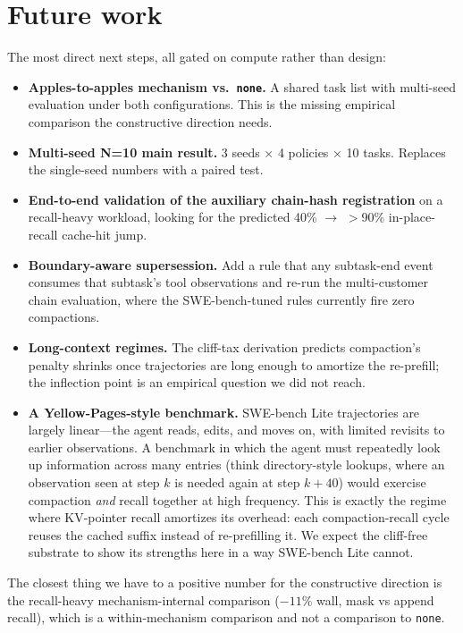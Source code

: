 \documentclass[letterpaper,twocolumn,10pt]{article}
\begin{document}
\section{Future work}
\label{sec:future}

The most direct next steps, all gated on compute rather than
design:

\begin{itemize}[itemsep=2pt,topsep=2pt]
\item \textbf{Apples-to-apples mechanism vs.~\texttt{none}.}
A shared task list with multi-seed evaluation under both
configurations. This is the missing empirical comparison the
constructive direction needs.
\item \textbf{Multi-seed N=10 main result.} 3 seeds × 4 policies
× 10 tasks. Replaces the single-seed numbers with a paired test.
\item \textbf{End-to-end validation of the auxiliary chain-hash
registration} on a recall-heavy workload, looking for the
predicted 40\% $\to$ $>$90\% in-place-recall cache-hit jump.
\item \textbf{Boundary-aware supersession.} Add a rule that any
subtask-end event consumes that subtask's tool observations and
re-run the multi-customer chain evaluation, where the
SWE-bench-tuned rules currently fire zero compactions.
\item \textbf{Long-context regimes.} The cliff-tax derivation
predicts compaction's penalty shrinks once trajectories are long
enough to amortize the re-prefill; the inflection point is an
empirical question we did not reach.
\item \textbf{A Yellow-Pages-style benchmark.} SWE-bench Lite
trajectories are largely linear---the agent reads, edits, and
moves on, with limited revisits to earlier observations. A
benchmark in which the agent must repeatedly look up
information across many entries (think directory-style
lookups, where an observation seen at step $k$ is needed again
at step $k{+}40$) would exercise compaction \emph{and} recall
together at high frequency. This is exactly the regime where
KV-pointer recall amortizes its overhead: each compaction-recall
cycle reuses the cached suffix instead of re-prefilling it. We
expect the cliff-free substrate to show its strengths here in a
way SWE-bench Lite cannot.
\end{itemize}

The closest thing we have to a positive number for the
constructive direction is the recall-heavy mechanism-internal
comparison ($-11\%$ wall, mask vs append recall), which is a
within-mechanism comparison and not a comparison to
\texttt{none}.
\end{document}
